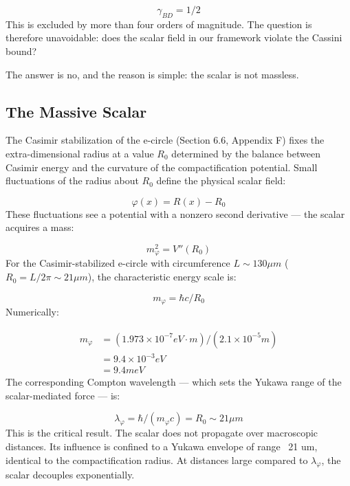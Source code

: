 \documentclass[aps,prd,preprint,superscriptaddress,longbibliography,floatfix]{revtex4-2}
\theoremstyle{remark}
\begin{document}
\begin{equation}
    \gamma_{BD} = 1/2
\end{equation}
This is excluded by more than four orders of magnitude. The question is therefore unavoidable: does the scalar field in our framework violate the Cassini bound?

The answer is no, and the reason is simple: the scalar is not massless.



\subsection{The Massive Scalar}

The Casimir stabilization of the e-circle (Section 6.6, Appendix F) fixes the extra-dimensional radius at a value $R_{0}$ determined by the balance between Casimir energy and the curvature of the compactification potential. Small fluctuations of the radius about $R_{0}$ define the physical scalar field:


\begin{equation}
    \varphi(x) = R(x) - R_{0}
\end{equation}
These fluctuations see a potential with a nonzero second derivative --- the scalar acquires a mass:


\begin{equation}
    m_\varphi^{2} = V''(R_{0})
\end{equation}
For the Casimir-stabilized e-circle with circumference $L \sim  130 \mu m$ ($R_{0} = L / 2\pi \sim  21 \mu m$), the characteristic energy scale is:


\begin{equation}
    m_\varphi = \hbar c / R_{0}
\end{equation}
Numerically:


\begin{align}
    m_\varphi &= (1.973 \times 10^{-7} eV\cdot m) / (2.1 \times 10^{-5} m) \\
    & = 9.4 \times 10^{-3} eV \\
    & = 9.4 meV
\end{align}
The corresponding Compton wavelength --- which sets the Yukawa range of the scalar-mediated force --- is:


\begin{equation}
    \lambda_\varphi = \hbar / (m_\varphi c) = R_{0} \sim  21 \mu m
\end{equation}
This is the critical result. The scalar does not propagate over macroscopic distances. Its influence is confined to a Yukawa envelope of range ~21 um, identical to the compactification radius. At distances large compared to $\lambda_\varphi$, the scalar decouples exponentially.
\end{document}
